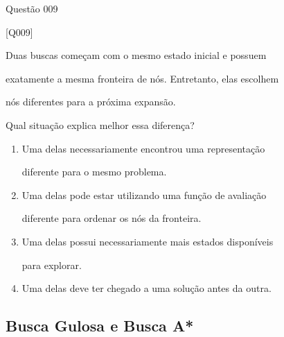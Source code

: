 \documentclass[xcolor=dvipsnames,table]{beamer}
\begin{document}
\begin{frame}{Questão 009}

    \small

    \begin{block}{[Q009]}

        Duas buscas começam com o mesmo estado inicial e possuem

        exatamente a mesma fronteira de nós. Entretanto, elas escolhem

        nós diferentes para a próxima expansão.

        Qual situação explica melhor essa diferença?

    \end{block}

    \begin{enumerate}[label=(\Alph*)]

        \item Uma delas necessariamente encontrou uma representação

        diferente para o mesmo problema.

        \item Uma delas pode estar utilizando uma função de avaliação

        diferente para ordenar os nós da fronteira.

        \item Uma delas possui necessariamente mais estados disponíveis

        para explorar.

        \item Uma delas deve ter chegado a uma solução antes da outra.

    \end{enumerate}

\end{frame}

\subsection{Busca Gulosa e Busca A*}
\end{document}
